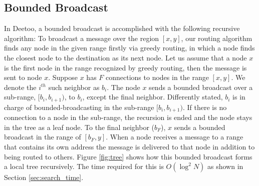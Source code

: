 \documentclass[conference]{IEEEtran}
\begin{document}
\subsection{Bounded Broadcast}
\label{sec:broadcast}

In Deetoo, a bounded broadcast is accomplished with the following 
recursive algorithm:  
To broadcast a message over the region $[x, y]$, 
our routing algorithm finds any node in the given range firstly via greedy routing,
in which a node finds the closest node to the destination as its next node.
Let us assume that a node $x$ is the first node in the range recognized by greedy routing, 
then the message is sent to node $x$. 
Suppose $x$ has $F$ connections to nodes in the range $[x, y]$. 
We denote the $i^{th}$ such neighbor as $b_i$.
The node $x$ sends a bounded broadcast over a sub-range, 
$[b_i, b_{i+1})$, to $b_i$, except the final neighbor. 
Differently stated, $b_i$ is in charge of bounded-broadcasting 
in the sub-range $[b_i, b_{i+1})$. If there is no connection to a node in the sub-range, 
the recursion is ended and the node stays in the tree as a leaf node.
To the final
neighbor ($b_F$), $x$ sends a bounded broadcast in the range of $[b_F, y]$.
When a node receives a message to a range that contains its own address
the message is delivered to that node in addition to being routed to others.
Figure \ref{fig:tree} shows how this bounded broadcast forms a local 
tree recursively. The time required for this is $O(\log^2 N)$ as 
shown in Section \ref{sec:search_time}.
\end{document}
